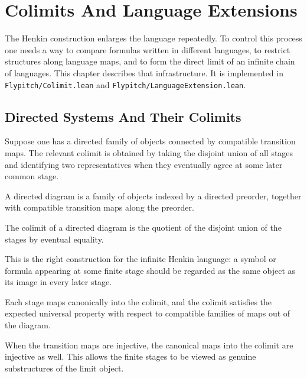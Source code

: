 \chapter{Colimits And Language Extensions}
\label{chap:colimits-language-extension}

The Henkin construction enlarges the language repeatedly. To control this
process one needs a way to compare formulas written in different languages, to
restrict structures along language maps, and to form the direct limit of an
infinite chain of languages. This chapter describes that infrastructure. It is
implemented in \texttt{Flypitch/Colimit.lean} and
\texttt{Flypitch/LanguageExtension.lean}.

\section{Directed Systems And Their Colimits}

Suppose one has a directed family of objects connected by compatible transition
maps. The relevant colimit is obtained by taking the disjoint union of all
stages and identifying two representatives when they eventually agree at some
later common stage.

\begin{definition}
\label{def:directed-diagram}
A directed diagram is a family of objects indexed by a directed preorder,
together with compatible transition maps along the preorder.
\end{definition}

\begin{definition}[Colimit]
\label{def:diagram-colimit}
The colimit of a directed diagram is the quotient of the disjoint union of the
stages by eventual equality.
\end{definition}

This is the right construction for the infinite Henkin language: a symbol or
formula appearing at some finite stage should be regarded as the same object as
its image in every later stage.

\begin{proposition}
\label{prop:colimit-universal}
Each stage maps canonically into the colimit, and the colimit satisfies the
expected universal property with respect to compatible families of maps out of
the diagram.
\end{proposition}

When the transition maps are injective, the canonical maps into the colimit are
injective as well. This allows the finite stages to be viewed as genuine
substructures of the limit object.

